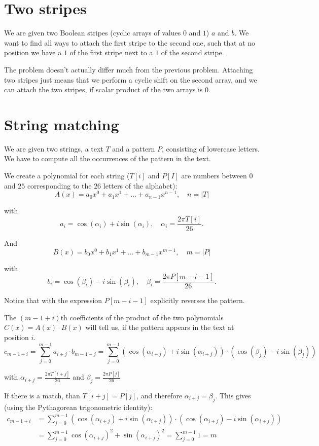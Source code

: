 \documentclass{report}
\begin{document}
\section{Two stripes}

We are given two Boolean stripes (cyclic arrays of values $0$ and $1$) $a$ and $b$. We want to find all ways to attach the first stripe to the second one, such that at no position we have a $1$ of the first stripe next to a $1$ of the second stripe.

The problem doesn't actually differ much from the previous problem. Attaching two stripes just means that we perform a cyclic shift on the second array, and we can attach the two stripes, if scalar product of the two arrays is $0$.

\section{String matching}

We are given two strings, a text $T$ and a pattern $P$, consisting of lowercase letters. We have to compute all the occurrences of the pattern in the text.

We create a polynomial for each string ($T[i]$ and $P[I]$ are numbers between $0$ and $25$ corresponding to the $26$ letters of the alphabet):
$$A(x) = a_0 x^0 + a_1 x^1 + \dots + a_{n-1} x^{n-1}, \quad n = |T|$$

with
$$a_i = \cos(\alpha_i) + i \sin(\alpha_i), \quad \alpha_i = \frac{2 \pi T[i]}{26}.$$

And
$$B(x) = b_0 x^0 + b_1 x^1 + \dots + b_{m-1} x^{m-1}, \quad m = |P|$$

with
$$b_i = \cos(\beta_i) - i \sin(\beta_i), \quad \beta_i = \frac{2 \pi P[m-i-1]}{26}.$$

Notice that with the expression $P[m-i-1]$ explicitly reverses the pattern.

The $(m-1+i)$th coefficients of the product of the two polynomials $C(x) = A(x) \cdot B(x)$ will tell us, if the pattern appears in the text at position $i$.
$$c_{m-1+i} = \sum_{j = 0}^{m-1} a_{i+j} \cdot b_{m-1-j} = \sum_{j=0}^{m-1} \left(\cos(\alpha_{i+j}) + i \sin(\alpha_{i+j})\right) \cdot \left(\cos(\beta_j) - i \sin(\beta_j)\right)$$

with $\alpha_{i+j} = \frac{2 \pi T[i+j]}{26}$ and $\beta_j = \frac{2 \pi P[j]}{26}$

If there is a match, than $T[i+j] = P[j]$, and therefore $\alpha_{i+j} = \beta_j$. This gives (using the Pythagorean trigonometric identity):
$$\begin{align} c_{m-1+i} &= \sum_{j = 0}^{m-1} \left(\cos(\alpha_{i+j}) + i \sin(\alpha_{i+j})\right) \cdot \left(\cos(\alpha_{i+j}) - i \sin(\alpha_{i+j})\right) \\ &= \sum_{j = 0}^{m-1} \cos(\alpha_{i+j})^2 + \sin(\alpha_{i+j})^2 = \sum_{j = 0}^{m-1} 1 = m \end{align}$$
\end{document}

